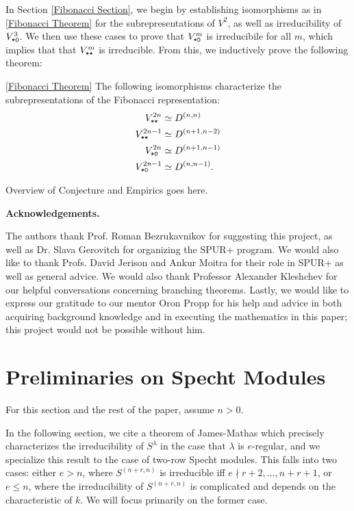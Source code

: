 \documentclass{amsart}
\newcommand{\fakesubsection}[1]{
    \vspace{7pt}
    \noindent \textbf{#1.}
  }
\begin{document}
  \vspace{5pt}
  In Section \ref{Fibonacci Section}, we begin by establishing isomorphisms as in \ref{Fibonacci Theorem} for the subrepresentations of $V^2$, as well as irreducibility of $V^3_{\texttt{*}\texttt{0}}$.
  We then use these cases to prove that $V^m_{\texttt{*}\texttt{0}}$ is irreducibile for all $m$, which implies that that $V^m_{\texttt{*}\texttt{*}}$ is irreducible.
  From this, we inductively prove the following theorem:
  \begingroup
  \hypersetup{linkcolor=\thmcolor}
  \begin{customthm}{\ref{Fibonacci Theorem}}
    The following isomorphisms characterize the subrepresentations of the Fibonacci representation:
    \begin{align*}  
       V^{2n}_{\texttt{*}\texttt{*}} &\simeq D^{(n,n)}\\ 
       V^{2n-1}_{\texttt{*}\texttt{*}} &\simeq D^{(n+1,n-2)}\\
       V^{2n}_{\texttt{*}\texttt{0}} &\simeq D^{(n+1,n-1)}\\
       V^{2n-1}_{\texttt{*}\texttt{0}} &\simeq D^{(n,n-1)}.
    \end{align*}
  \end{customthm}
  \endgroup
  {\color{orange} Overview of Conjecture and Empirics goes here.}

  \fakesubsection{Acknowledgements}
  The authors thank Prof. Roman Bezrukavnikov for suggesting this project, as well as Dr. Slava Gerovitch for organizing the SPUR+ program.
  We would also like to thank Profs. David Jerison and Ankur Moitra for their role in SPUR+ as well as general advice.
  We would also thank Professor Alexander Kleshchev for our helpful conversations concerning branching theorems.
  Lastly, we would like to express our gratitude to our mentor Oron Propp for his help and advice in both acquiring background knowledge and in executing the mathematics in this paper;
  this project would not be possible without him.
   
\section{Preliminaries on Specht Modules}\label{Specht Modules Section}
  For this section and the rest of the paper, assume $n > 0$.

  In the following section, we cite a theorem of James-Mathas which precisely characterizes the irreducibility of $S^\lambda$ in the case that $\lambda$ is $e$-regular, and we specialize this result to the case of two-row Specht modules.
  This falls into two cases: either $e > n$, where $S^{(n+r,n)}$ is irreducible iff $e \nmid r+2,\dots,n+r+1$, or $e \leq n$, where the irreducibility of $S^{(n+r,n)}$ is complicated and depends on the characteristic of $k$.
  We will focus primarily on the former case.
\end{document}
